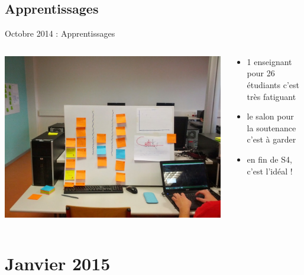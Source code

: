 \documentclass{beamer}
\begin{document}
\subsection{Apprentissages}
\begin{frame}{Octobre 2014 : Apprentissages}
  \begin{columns}
    \begin{column}{0.5\textwidth}
      \begin{center}
        \includegraphics[width=\textwidth]{includes/201410_dashboard.jpg}      
      \end{center}
    \end{column}
    \begin{column}{0.5\textwidth}
      \begin{itemize}
        \item 1 enseignant pour 26 étudiants c'est très fatiguant
        \item le salon pour la soutenance c'est à garder
        \item en fin de S4, c'est l'idéal !
      \end{itemize}
    \end{column}
  \end{columns}
\end{frame}

\section{Janvier 2015}
\end{document}
